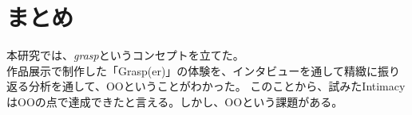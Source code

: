 \chapter{まとめ}
本研究では、\textit{grasp}というコンセプトを立てた。\\
作品展示で制作した「Grasp(er)」の体験を、インタビューを通して精緻に振り返る分析を通して、OOということがわかった。
このことから、試みたIntimacyはOOの点で達成できたと言える。しかし、OOという課題がある。